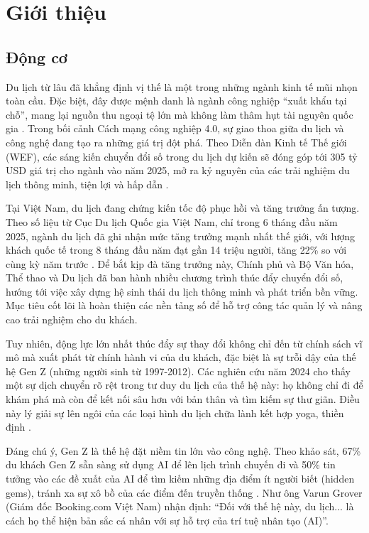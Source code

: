 \section{Giới thiệu}
\subsection{Động cơ}
Du lịch từ lâu đã khẳng định vị thế là một trong những ngành kinh tế mũi nhọn toàn cầu. Đặc biệt, đây được mệnh danh là ngành công nghiệp ``xuất khẩu tại chỗ'', mang lại nguồn thu ngoại tệ lớn mà không làm thâm hụt tài nguyên quốc gia \cite{vietnamtourism_export}. Trong bối cảnh Cách mạng công nghiệp 4.0, sự giao thoa giữa du lịch và công nghệ đang tạo ra những giá trị đột phá. Theo Diễn đàn Kinh tế Thế giới (WEF), các sáng kiến chuyển đổi số trong du lịch dự kiến sẽ đóng góp tới 305 tỷ USD giá trị cho ngành vào năm 2025, mở ra kỷ nguyên của các trải nghiệm du lịch thông minh, tiện lợi và hấp dẫn \cite{wef_digital}.

Tại Việt Nam, du lịch đang chứng kiến tốc độ phục hồi và tăng trưởng ấn tượng. Theo số liệu từ Cục Du lịch Quốc gia Việt Nam, chỉ trong 6 tháng đầu năm 2025, ngành du lịch đã ghi nhận mức tăng trưởng mạnh nhất thế giới, với lượng khách quốc tế trong 8 tháng đầu năm đạt gần 14 triệu người, tăng 22\% so với cùng kỳ năm trước \cite{vnexpress_growth}. Để bắt kịp đà tăng trưởng này, Chính phủ và Bộ Văn hóa, Thể thao và Du lịch đã ban hành nhiều chương trình thúc đẩy chuyển đổi số, hướng tới việc xây dựng hệ sinh thái du lịch thông minh và phát triển bền vững. Mục tiêu cốt lõi là hoàn thiện các nền tảng số để hỗ trợ công tác quản lý và nâng cao trải nghiệm cho du khách.

Tuy nhiên, động lực lớn nhất thúc đẩy sự thay đổi không chỉ đến từ chính sách vĩ mô mà xuất phát từ chính hành vi của du khách, đặc biệt là sự trỗi dậy của thế hệ Gen Z (những người sinh từ 1997-2012). Các nghiên cứu năm 2024 cho thấy một sự dịch chuyển rõ rệt trong tư duy du lịch của thế hệ này: họ không chỉ đi để khám phá mà còn để kết nối sâu hơn với bản thân và tìm kiếm sự thư giãn. Điều này lý giải sự lên ngôi của các loại hình du lịch chữa lành kết hợp yoga, thiền định \cite{qdnd_genz}.

Đáng chú ý, Gen Z là thế hệ đặt niềm tin lớn vào công nghệ. Theo khảo sát, 67\% du khách Gen Z sẵn sàng sử dụng AI để lên lịch trình chuyến đi và 50\% tin tưởng vào các đề xuất của AI để tìm kiếm những địa điểm ít người biết (hidden gems), tránh xa sự xô bồ của các điểm đến truyền thống \cite{booking_genz_2024}. Như ông Varun Grover (Giám đốc Booking.com Việt Nam) nhận định: ``Đối với thế hệ này, du lịch... là cách họ thể hiện bản sắc cá nhân với sự hỗ trợ của trí tuệ nhân tạo (AI)''.

